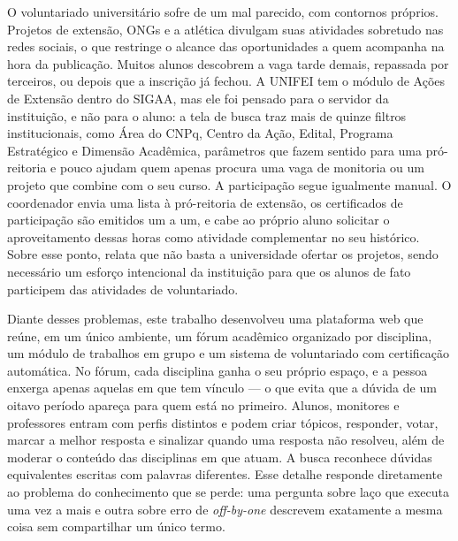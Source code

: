 O voluntariado universitário sofre de um mal parecido, com contornos próprios. Projetos de extensão, ONGs e a atlética divulgam suas atividades sobretudo nas redes sociais, o que restringe o alcance das oportunidades a quem acompanha na hora da publicação. Muitos alunos descobrem a vaga tarde demais, repassada por terceiros, ou depois que a inscrição já fechou. A UNIFEI tem o módulo de Ações de Extensão dentro do SIGAA, mas ele foi pensado para o servidor da instituição, e não para o aluno: a tela de busca traz mais de quinze filtros institucionais, como Área do CNPq, Centro da Ação, Edital, Programa Estratégico e Dimensão Acadêmica, parâmetros que fazem sentido para uma pró-reitoria e pouco ajudam quem apenas procura uma vaga de monitoria ou um projeto que combine com o seu curso. A participação segue igualmente manual. O coordenador envia uma lista à pró-reitoria de extensão, os certificados de participação são emitidos um a um, e cabe ao próprio aluno solicitar o aproveitamento dessas horas como atividade complementar no seu histórico. Sobre esse ponto, \cite{lopesjr2023} relata que não basta a universidade ofertar os projetos, sendo necessário um esforço intencional da instituição para que os alunos de fato participem das atividades de voluntariado.

Diante desses problemas, este trabalho desenvolveu uma plataforma web que reúne, em um único ambiente, um fórum acadêmico organizado por disciplina, um módulo de trabalhos em grupo e um sistema de voluntariado com certificação automática. No fórum, cada disciplina ganha o seu próprio espaço, e a pessoa enxerga apenas aquelas em que tem vínculo — o que evita que a dúvida de um oitavo período apareça para quem está no primeiro. Alunos, monitores e professores entram com perfis distintos e podem criar tópicos, responder, votar, marcar a melhor resposta e sinalizar quando uma resposta não resolveu, além de moderar o conteúdo das disciplinas em que atuam. A busca reconhece dúvidas equivalentes escritas com palavras diferentes. Esse detalhe responde diretamente ao problema do conhecimento que se perde: uma pergunta sobre laço que executa uma vez a mais e outra sobre erro de \textit{off-by-one} descrevem exatamente a mesma coisa sem compartilhar um único termo.

